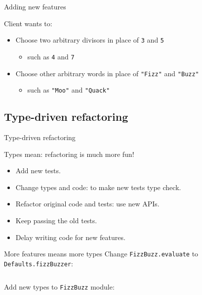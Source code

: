 \begin{frame}{Adding new features}
  \begin{block}{Client wants to:}
    \begin{itemize}
    \item Choose two \alert{arbitrary} divisors in place of \texttt{3} and \texttt{5}
      \begin{itemize}
      \item such as \texttt{4} and \texttt{7}
      \end{itemize}
    \item Choose other \alert{arbitrary} words in place of \texttt{"Fizz"} and \texttt{"Buzz"}
      \begin{itemize}
      \item such as \texttt{"Moo"} and \texttt{"Quack"}

      \end{itemize}
    \end{itemize}
  \end{block}
\end{frame}

\subsection{Type-driven refactoring}

\begin{frame}{Type-driven refactoring}
  \begin{block}{Types mean: refactoring is much more fun!}
  \begin{itemize}
  \item Add \alert{new} tests.
  \item Change types and code: to make new tests \alert{type check}.
  \item \alert{Refactor} original code and tests: use new APIs.
  \item Keep passing the \alert{old} tests.
  \item Delay writing code for new features.
  \end{itemize}
  \end{block}
\end{frame}

\begin{frame}[fragile]{More features means more types}
  Change \texttt{FizzBuzz.evaluate} to \texttt{Defaults.fizzBuzzer}:
  \inputminted[gobble=2]{scala}{Main5.scala}

  Add new types to \texttt{FizzBuzz} module:
  \inputminted[gobble=2]{scala}{FizzBuzz3.scala}
\end{frame}


